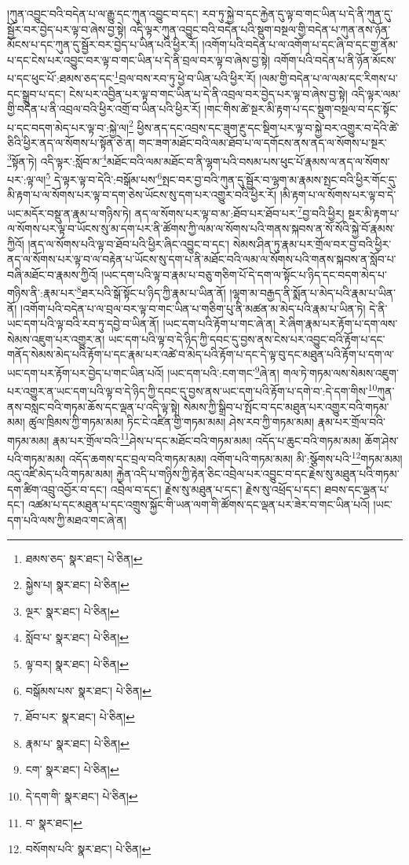 །ཀུན་འབྱུང་བའི་བདེན་པ་ལ་རྒྱུ་དང་ཀུན་འབྱུང་བ་དང་། རབ་ཏུ་སྐྱེ་བ་དང་རྐྱེན་དུ་ལྟ་བ་གང་ཡིན་པ་དེ་ནི་ཀུན་དུ་སྦྱོར་བར་བྱེད་པར་ལྟ་བ་ཞེས་བྱ་སྟེ། འདི་ལྟར་ཀུན་འབྱུང་བའི་བདེན་པའི་སྡུག་བསྔལ་གྱི་བདེན་པ་ཀུན་ནས་ཉོན་མོངས་པ་དང་ཀུན་དུ་སྦྱོར་བར་བྱེད་པ་ཡིན་པའི་ཕྱིར་རོ། །འགོག་པའི་བདེན་པ་ལ་འགོག་པ་དང་ཞི་བ་དང་གྱ་ནོམ་པ་དང་ངེས་པར་འབྱུང་བར་ལྟ་བ་གང་ཡིན་པ་དེ་ནི་བྲལ་བར་ལྟ་བ་ཞེས་བྱ་སྟེ། འགོག་པའི་བདེན་པ་ནི་ཉོན་མོངས་པ་དང་ཕུང་པོ་:ཐམས་ཅད་དང་\footnote{ཐམས་ཅད་  སྣར་ཐང་།  པེ་ཅིན། }བྲལ་བས་རབ་ཏུ་ཕྱེ་བ་ཡིན་པའི་ཕྱིར་རོ། །ལམ་གྱི་བདེན་པ་ལ་ལམ་དང་རིགས་པ་དང་སྒྲུབ་པ་དང་། ངེས་པར་འབྱིན་པར་ལྟ་བ་གང་ཡིན་པ་དེ་ནི་འབྲལ་བར་བྱེད་པར་ལྟ་བ་ཞེས་བྱ་སྟེ། འདི་ལྟར་ལམ་གྱི་བདེན་པ་ནི་འབྲལ་བའི་ཕྱིར་འགྲོ་བ་ཡིན་པའི་ཕྱིར་རོ། །གང་གིས་ཚེ་སྔར་མི་རྟག་པ་དང་སྡུག་བསྔལ་བ་དང་སྟོང་པ་དང་བདག་མེད་པར་ལྟ་བ་:སྐྱེ་ལ།\footnote{སྐྱེས་པ།  སྣར་ཐང་།  པེ་ཅིན། } ཕྱིས་ནད་དང་འབྲས་དང་ཟུག་རྔུ་དང་སྡིག་པར་ལྟ་བ་སྐྱེ་བར་འགྱུར་བ་དེའི་ཚེ་ཅིའི་ཕྱིར་ནད་ལ་སོགས་པ་སྟོན་ཅེ་ན། གང་ཟག་མཐོང་བའི་ལམ་ཐོབ་པ་ལ་དགོངས་ནས་ནད་ལ་སོགས་པ་སྔར་\footnote{ལྔར་  སྣར་ཐང་།  པེ་ཅིན། }སྟོན་ཏེ། འདི་ལྟར་:སློབ་མ་\footnote{སློབ་པ་  སྣར་ཐང་།  པེ་ཅིན། }མཐོང་བའི་ལམ་མཐོང་བ་ནི་ལྷག་པའི་བསམ་པས་ཕུང་པོ་རྣམས་ལ་ནད་ལ་སོགས་པར་:ལྟ་ལ།\footnote{ལྟ་བར།  སྣར་ཐང་།  པེ་ཅིན། } དེ་ལྟར་ལྟ་བ་དེའི་:བསྒོམ་པས་\footnote{བསྒོམས་པས་  སྣར་ཐང་།  པེ་ཅིན། }སྤང་བར་བྱ་བའི་ཀུན་དུ་སྦྱོར་བ་ལྷག་མ་རྣམས་སྤང་བའི་ཕྱིར་གོང་དུ་མི་རྟག་པ་ལ་སོགས་པར་ལྟ་བ་དག་ཅེས་ཡོངས་སུ་དག་པར་འགྱུར་བའི་ཕྱིར་རོ། །མི་རྟག་པ་ལ་སོགས་པར་ལྟ་བ་དེ་ཡང་མདོར་བསྡུ་ན་རྣམ་པ་གཉིས་ཏེ། ནད་ལ་སོགས་པར་ལྟ་བ་མ་:ཐོབ་པར་ཐོབ་པར་\footnote{ཐོབ་པར་  སྣར་ཐང་།  པེ་ཅིན། }བྱ་བའི་ཕྱིར། སྔར་མི་རྟག་པ་ལ་སོགས་པར་ལྟ་བ་ཡོངས་སུ་མ་དག་པར་ནི་ཚོགས་ཀྱི་ལམ་ལ་སོགས་པའི་གནས་སྐབས་ན་སོ་སོའི་སྐྱེ་བོ་རྣམས་ཀྱིའོ། །ནད་ལ་སོགས་པའི་ལྟ་བ་ཐོབ་པའི་ཕྱིར་ཞིང་འབྱུང་བ་དང་། སེམས་ཤིན་ཏུ་རྣམ་པར་གྲོལ་བར་བྱ་བའི་ཕྱིར་ནད་ལ་སོགས་པར་ལྟ་བ་ལ་བརྟེན་པ་ཡོངས་སུ་དག་པ་ནི་མཐོང་བའི་ལམ་ལ་སོགས་པའི་གནས་སྐབས་ན་སློབ་པ་བཞི་མཐོང་བ་རྣམས་ཀྱིའོ། །ཡང་དག་པའི་ལྟ་བ་རྣམ་པ་བཅུ་གཅིག་པོ་དེ་དག་ལ་སྟོང་པ་ཉིད་དང་བདག་མེད་པ་གཉིས་ནི་:རྣམ་པར་\footnote{རྣམ་པ་  སྣར་ཐང་།  པེ་ཅིན། }ཐར་པའི་སྒོ་སྟོང་པ་ཉིད་ཀྱི་རྣམ་པ་ཡིན་ནོ། །ལྷག་མ་བརྒྱད་ནི་སྨོན་པ་མེད་པའི་རྣམ་པ་ཡིན་ནོ། །འགོག་པའི་བདེན་པ་ལ་བྲལ་བར་ལྟ་བ་གང་ཡིན་པ་གཅིག་པུ་ནི་མཚན་མ་མེད་པའི་རྣམ་པ་ཡིན་ཏེ། དེ་ནི་ཡང་དག་པའི་ལྟ་བའི་རབ་ཏུ་དབྱེ་བ་ཡིན་ནོ། །ཡང་དག་པའི་རྟོག་པ་གང་ཞེ་ན། རེ་ཞིག་རྣམ་པར་རྟོག་པ་དག་ལས་སེམས་འཇུག་པར་འགྱུར་ན། ཡང་དག་པའི་ལྟ་བ་དེ་ཉིད་ཀྱི་དབང་དུ་བྱས་ནས་ངེས་པར་འབྱུང་བའི་རྟོག་པ་དང་གནོད་སེམས་མེད་པའི་རྟོག་པ་དང་རྣམ་པར་འཚེ་བ་མེད་པའི་རྟོག་པ་དང་དེ་ལྟ་བུ་དང་མཐུན་པའི་རྟོག་པ་དག་ལ་ཡང་དག་པར་རྟོག་པར་བྱེད་པ་གང་ཡིན་པའོ། །ཡང་དག་པའི་:ངག་གང་\footnote{ངག་  སྣར་ཐང་།  པེ་ཅིན། }ཞེ་ན། གལ་ཏེ་གཏམ་ལས་སེམས་འཇུག་པར་འགྱུར་ན་ཡང་དག་པའི་ལྟ་བ་དེ་ཉིད་ཀྱི་དབང་དུ་བྱས་ནས་ཡང་དག་པའི་རྟོག་པ་དགེ་བ་:དེ་དག་གིས་\footnote{དེ་དག་གི་  སྣར་ཐང་།  པེ་ཅིན། }ཀུན་ནས་བསླང་བའི་གཏམ་ཆོས་དང་ལྡན་པ་འདི་ལྟ་སྟེ། སེམས་ཀྱི་སྒྲིབ་པ་སྤོང་བ་དང་མཐུན་པར་འགྱུར་བའི་གཏམ་མམ། ཚུལ་ཁྲིམས་ཀྱི་གཏམ་མམ། ཏིང་ངེ་འཛིན་གྱི་གཏམ་མམ། ཤེས་རབ་ཀྱི་གཏམ་མམ། རྣམ་པར་གྲོལ་བའི་གཏམ་མམ། རྣམ་པར་གྲོལ་བའི་\footnote{བ་  སྣར་ཐང་། }ཤེས་པ་དང་མཐོང་བའི་གཏམ་མམ། འདོད་པ་ཆུང་བའི་གཏམ་མམ། ཆོག་ཤེས་པའི་གཏམ་མམ། འདོད་ཆགས་དང་བྲལ་བའི་གཏམ་མམ། འགོག་པའི་གཏམ་མམ། མི་:སྩོགས་པའི་\footnote{བསོགས་པའི་  སྣར་ཐང་།  པེ་ཅིན། }གཏམ་མམ། འདུ་འཛི་མེད་པའི་གཏམ་མམ། རྐྱེན་འདི་པ་གཉིས་ཀྱི་རྟེན་ཅིང་འབྲེལ་པར་འབྱུང་བ་དང་རྗེས་སུ་མཐུན་པའི་གཏམ་དག་ཚིག་འབྲུ་འབྱོར་བ་དང་། འབྲེལ་བ་དང་། རྗེས་སུ་མཐུན་པ་དང་། རྗེས་སུ་འཕྲོད་པ་དང་། ཐབས་དང་ལྡན་པ་དང་། འཚམ་པ་དང་མཐུན་པ་དང་འགྲུས་སྐྱོང་གི་ཡན་ལག་གི་ཚོགས་དང་ལྡན་པར་ཟེར་བ་གང་ཡིན་པའོ། །ཡང་དག་པའི་ལས་ཀྱི་མཐའ་གང་ཞེ་ན། 